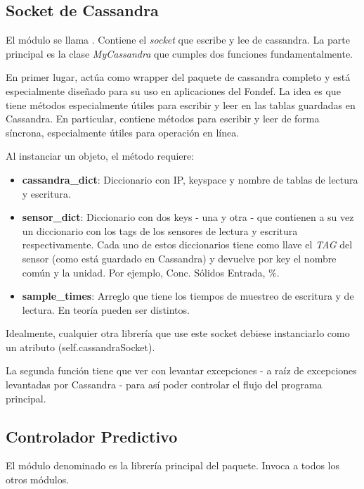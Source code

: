 \documentclass{article}
\begin{document}
\subsection{Socket de Cassandra}

El módulo se llama . Contiene el \textit{socket} que escribe y lee de cassandra. La parte principal es la clase \emph{MyCassandra} que cumples dos funciones fundamentalmente.

En primer lugar, actúa como wrapper del paquete de cassandra completo y está especialmente diseñado para su uso en aplicaciones del Fondef. La idea es que tiene métodos especialmente útiles para escribir y leer en las tablas guardadas en Cassandra. En particular, contiene métodos para escribir y leer de forma síncrona, especialmente útiles para operación en línea.

Al instanciar un objeto, el método  requiere:
\begin{itemize}
\item \textbf{cassandra\_dict}: Diccionario con IP, keyspace y nombre de tablas de lectura y escritura.
\item \textbf{sensor\_dict}: Diccionario con dos keys - una  y otra  - que contienen a su vez un diccionario con los tags de los sensores de lectura y escritura respectivamente. Cada uno de estos diccionarios tiene como llave el \emph{TAG} del sensor (como está guardado en Cassandra) y devuelve por key el nombre común y la unidad. Por ejemplo, Conc. Sólidos Entrada, \%.
\item \textbf{sample\_times}: Arreglo que tiene los tiempos de muestreo de escritura y de lectura. En teoría pueden ser distintos.
\end{itemize}

Idealmente, cualquier otra librería que use este socket debiese instanciarlo como un atributo (self.cassandraSocket).

La segunda función tiene que ver con levantar excepciones - a raíz de excepciones levantadas por Cassandra - para así poder controlar el flujo del programa principal.

\subsection{Controlador Predictivo \label{sec:mlMPC}}

El módulo denominado  es la librería principal del paquete. Invoca a todos los otros módulos.
\end{document}

